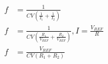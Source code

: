 \documentclass[12pt]{article}
\begin{document}
\begin{align*}
f &= \frac{1}{CV \left( \frac{1}{I_1} + \frac{1}{I_2} \right)}\\
f &= \frac{1}{CV \left( \frac{R_1}{V_{REF}} + \frac{R_2}{V_{REF}} \right)}, I = \frac{V_{REF}}{R}\\
f &= \frac{V_{REF}}{CV \left( R_1 + R_2 \right)}
\end{align*}
\end{document}
